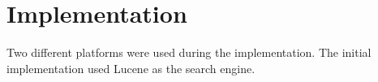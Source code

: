 \section{Implementation}
\label{sec:implementation}
Two different platforms were used during the implementation.
The initial implementation used Lucene as the search engine.




